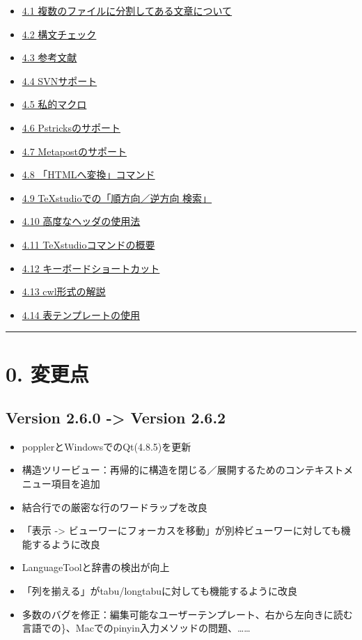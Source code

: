 \documentclass[]{book}
\begin{document}
\begin{itemize}
  \begin{itemize}
  \item
    \hyperref[SECTION31]{4.1 複数のファイルに分割してある文章について}
  \item
    \hyperref[SECTION32a]{4.2 構文チェック}
  \item
    \hyperref[SECTION32]{4.3 参考文献}
  \item
    \hyperref[SECTION33a]{4.4 SVNサポート}
  \item
    \hyperref[SECTION33]{4.5 私的マクロ}
  \item
    \hyperref[SECTION34]{4.6 Pstricksのサポート}
  \item
    \hyperref[SECTION35]{4.7 Metapostのサポート}
  \item
    \hyperref[SECTION36]{4.8 「HTMLへ変換」コマンド}
  \item
    \hyperref[SECTION37]{4.9 TeXstudioでの「順方向／逆方向 検索」}
  \item
    \hyperref[SECTION\_TEXCOM]{4.10 高度なヘッダの使用法}
  \item
    \hyperref[SECTION38]{4.11 TeXstudioコマンドの概要}
  \item
    \hyperref[SECTION39]{4.12 キーボードショートカット}
  \item
    \hyperref[CWLDESCRIPTION]{4.13 cwl形式の解説}
  \item
    \hyperref[TABLETEMPLATE]{4.14 表テンプレートの使用}
  \end{itemize}
\end{itemize}

\begin{center}\rule{3in}{0.4pt}\end{center}

\chapter{0. 変更点}

\section{Version 2.6.0 -\textgreater{} Version 2.6.2}

\begin{itemize}
\item
  popplerとWindowsでのQt(4.8.5)を更新
\item
  構造ツリービュー：再帰的に構造を閉じる／展開するためのコンテキストメニュー項目を追加
\item
  結合行での厳密な行のワードラップを改良
\item
  「表示 -\textgreater{}
  ビューワーにフォーカスを移動」が別枠ビューワーに対しても機能するように改良
\item
  LanguageToolと辞書の検出が向上
\item
  「列を揃える」がtabu/longtabuに対しても機能するように改良
\item
  多数のバグを修正：編集可能なユーザーテンプレート、右から左向きに読む言語での\}、Macでのpinyin入力メソッドの問題、\ldots{}\ldots{}
\end{itemize}
\end{document}
